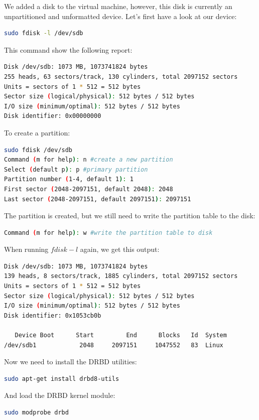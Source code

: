 \documentclass[12pt]{report}
\begin{document}
We added a disk to the virtual machine, however, this disk is
currently an unpartitioned and unformatted device.
Let's first have a look at our device:
\begin{lstlisting}[language=bash]
sudo fdisk -l /dev/sdb
\end{lstlisting}
This command show the following report:
\begin{lstlisting}[language=bash]
Disk /dev/sdb: 1073 MB, 1073741824 bytes
255 heads, 63 sectors/track, 130 cylinders, total 2097152 sectors
Units = sectors of 1 * 512 = 512 bytes
Sector size (logical/physical): 512 bytes / 512 bytes
I/O size (minimum/optimal): 512 bytes / 512 bytes
Disk identifier: 0x00000000
\end{lstlisting}
To create a partition:
\begin{lstlisting}[language=bash]
sudo fdisk /dev/sdb
Command (m for help): n #create a new partition
Select (default p): p #primary partition
Partition number (1-4, default 1): 1
First sector (2048-2097151, default 2048): 2048
Last sector (2048-2097151, default 2097151): 2097151
\end{lstlisting}
The partition is created, but we still need to write the partition
table to the disk:
\begin{lstlisting}[language=bash]
Command (m for help): w #write the partition table to disk
\end{lstlisting}
When running $fdisk -l$ again, we get this output:
\begin{lstlisting}[language=bash]
Disk /dev/sdb: 1073 MB, 1073741824 bytes
139 heads, 8 sectors/track, 1885 cylinders, total 2097152 sectors
Units = sectors of 1 * 512 = 512 bytes
Sector size (logical/physical): 512 bytes / 512 bytes
I/O size (minimum/optimal): 512 bytes / 512 bytes
Disk identifier: 0x1053cb0b

   Device Boot      Start         End      Blocks   Id  System
/dev/sdb1            2048     2097151     1047552   83  Linux
\end{lstlisting}

Now we need to install the DRBD utilities:
\begin{lstlisting}[language=bash]
sudo apt-get install drbd8-utils
\end{lstlisting}
And load the DRBD kernel module:
\begin{lstlisting}[language=bash]
sudo modprobe drbd
\end{lstlisting}
\end{document}
